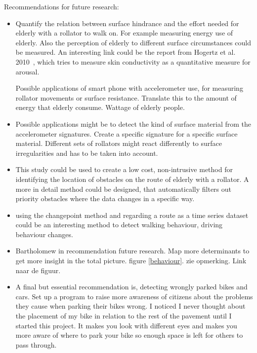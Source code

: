 Recommendations for future research:

\begin{itemize}
\item Quantify the relation between surface hindrance and the effort needed for elderly with a rollator to walk on. For example measuring energy use of elderly. Also the perception of elderly to different surface circumstances could be measured. An interesting link could be the report from Hogertz et al. 2010~\cite{Sauter2010}, which tries to measure skin conductivity as a quantitative measure for arousal. 



Possible applications of smart phone with accelerometer use, for measuring rollator movements or surface resistance. Translate this to the amount of energy that elderly consume. Wattage of elderly people. %

\item Possible applications might be to detect the kind of surface material from the accelerometer signatures. Create a specific signature for a specific surface material. Different sets of rollators might react differently to surface irregularities and has to be taken into account.

\item This study could be used to create a low cost, non-intrusive method for identifying the location of obstacles on the route of elderly with a rollator. A more in detail method could be designed, that automatically filters out priority obstacles where the data changes in a specific way. 

\item using the changepoint method and regarding a route as a time series dataset could be an interesting method to detect walking behaviour, driving behaviour changes. 


\item Bartholomew in recommendation future research. Map more determinants to get more insight in the total picture. figure \ref{behaviour}. zie opmerking. Link naar de figuur. 

\item A final but essential recommendation is, detecting wrongly parked bikes and cars. %
Set up a program to raise more awareness of citizens about the problems they cause when parking their bikes wrong. I noticed I never thought about the placement of my bike in relation to the rest of the pavement until I started this project. It makes you look with different eyes and makes you more aware of where to park your bike so enough space is left for others to pass through. 

\end{itemize}






